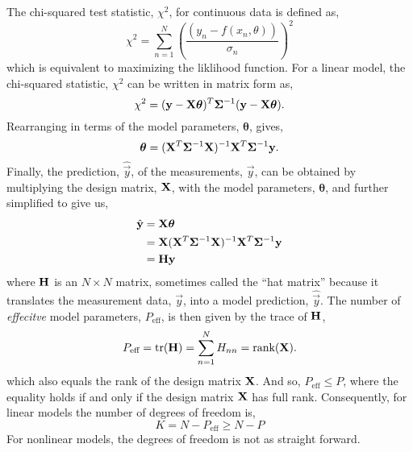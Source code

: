 The chi-squared test statistic, $\chi^2$, for continuous data is defined as,
%
\begin{equation}
  \chi^2 = \sum^{N}_{n = 1}
    \left( \dfrac{(y_n - f(x_n, \theta))}{\sigma_n} \right)^2
\end{equation}
%
which is equivalent to maximizing the liklihood function. For a linear model,
the chi-squared statistic, $\chi^2$ can be written in matrix form as,
%
\begin{equation}
  \chi^2 =
    ({\mathbf{y}} - {\mathbf{X}} \boldsymbol{\theta})^{T}
    {\mathbf{\Sigma}}^{-1}
    ({\mathbf{y}} - {\mathbf{X}} \boldsymbol{\theta}) .
\end{equation}
%
Rearranging in terms of the model parameters, $\boldsymbol{\theta}$, gives,
\begin{equation}
  \boldsymbol{\theta} =
    ({\mathbf{X}}^{T} {\mathbf{\Sigma}}^{-1} {\mathbf{X}})^{-1}
    {\mathbf{X}}^{T} {\mathbf{\Sigma}}^{-1} {\mathbf{y}} .
\end{equation}
%
Finally, the prediction, $\hat{\Vec{y}}$, of the measurements, $\Vec{y}$, can
be obtained by multiplying the design matrix, ${\mathbf{X}}$, with the model
parameters, $\boldsymbol{\theta}$, and further simplified to give us,
%
\begin{align}
  \hat{{\mathbf{y}}}
    &= {\mathbf{X}} \boldsymbol{\theta} \\
    &= {\mathbf{X}} ({{{\mathbf{X}}^{T}}} {\mathbf{\Sigma}}^{-1} {\mathbf{X}})^{-1}
       {{{\mathbf{X}}^{T}}} {\mathbf{\Sigma}}^{-1} {\mathbf{y}} \\
    &= {\mathbf{H}} {\mathbf{y}}
\end{align}
%
where ${\mathbf{H}}$ is an $N \times N$ matrix, sometimes called the ``hat matrix''
because it translates the measurement data, $\Vec{y}$, into a model prediction,
$\hat{\Vec{y}}$. The number of \textit{effecitve} model parameters,
$P_{\text{eff}}$, is then given by the trace of ${\mathbf{H}}$,
%
\begin{equation}
  P_{\text{eff}} = \text{tr}({\mathbf{H}}) = \sum^{N}_{n = 1} H_{nn} = \text{rank}({\mathbf{X}}) .
\end{equation}
%
which also equals the rank of the design matrix ${\mathbf{X}}$. And so,
$P_{\text{eff}} \leq P$, where the equality holds if and only if the design
matrix ${\mathbf{X}}$ has full rank. Consequently, for linear models the number of
degrees of freedom is,
%
\begin{equation}
  K = N - P_{\text{eff}} \geq N - P
\end{equation}
%
For nonlinear models, the degrees of freedom is not as straight forward.


